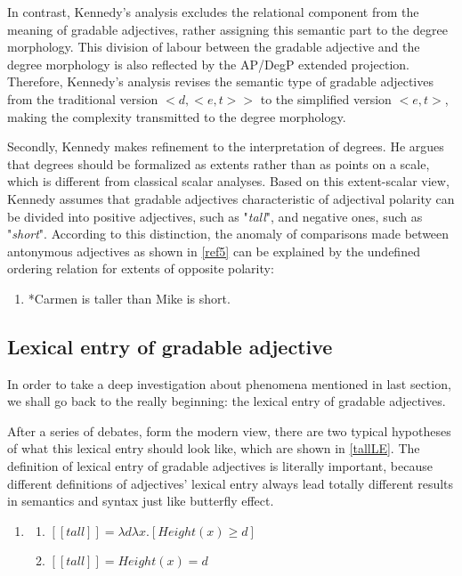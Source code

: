 \documentclass{ctexart}
\let \cite \parencite
\begin{document}
In contrast, Kennedy’s analysis excludes the relational component from the meaning of gradable adjectives, rather assigning this semantic part to the degree morphology. This division of labour between the gradable adjective and the degree morphology is also reflected by the AP/DegP extended projection. Therefore, Kennedy’s analysis revises the semantic type of gradable adjectives from the traditional version $<d,<e,t>>$ to the simplified version $<e,t>$, making the complexity transmitted to the degree morphology.

Secondly, Kennedy makes refinement to the interpretation of degrees. He argues that degrees should be formalized as extents\cite{seuren1978,von1984b,bierwisch1989,lobner2010} rather than as points on a scale, which is different from classical scalar analyses. Based on this extent-scalar view, Kennedy assumes that gradable adjectives characteristic of adjectival polarity can be divided into positive adjectives, such as "\textit{tall}", and negative ones, such as "\textit{short}". According to this distinction, the anomaly of comparisons made between antonymous adjectives as shown in \ref{ref5} can be explained by the undefined ordering relation for extents of opposite polarity:

\begin{enumerate}[resume]
\item \label{ref5}
*Carmen is taller than Mike is short.
\end{enumerate}

\subsection{Lexical entry of gradable adjective}

In order to take a deep investigation about phenomena mentioned in last section, we shall go back to the really beginning: the lexical entry of gradable adjectives. 

After a series of debates, form the modern view, there are two typical hypotheses of what this lexical entry should look like, which are shown in \ref{tallLE}. The definition of lexical entry of gradable adjectives is literally important, because different definitions of adjectives' lexical entry always lead totally different results in semantics and syntax just like butterfly effect.

\begin{enumerate}[resume]
    \item \label{tallLE}
    
    \begin{enumerate}[ref=(\arabic{enumi}\alph*)]
        \item \label{tallLE_a} 
        $[\![tall]\!]=\lambda d \lambda x.[Height(x) \geq d]$
    
        \item \label{tallLE_b} 
        $[\![tall]\!]=Height(x)=d$
    
    \end{enumerate}
\end{enumerate}
\end{document}
